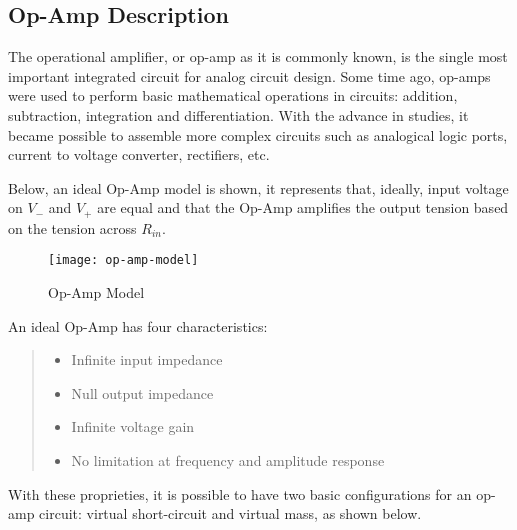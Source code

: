 \documentclass[journal]{IEEEtran}
\begin{document}
    \subsection{Op-Amp Description}
        The operational amplifier, or op-amp as it is commonly known, is the single most important integrated circuit for analog circuit design\cite[pp. 148]{irwin}. Some time ago, op-amps were used to perform basic mathematical operations in circuits: addition, subtraction, integration and differentiation. With the advance in studies, it became possible to assemble more complex circuits such as analogical logic ports, current to voltage converter, rectifiers, etc.
        \par Below, an ideal Op-Amp model is shown, it represents that, ideally, input voltage on $V_-$ and $V_+$ are equal and that the Op-Amp amplifies the output tension based on the tension across $R_{in}$.
        \begin{figure}[h]
            \begin{center}
                \texttt{[image: op-amp-model]}
                \caption{Op-Amp Model}
                \label{fig:op-amp-model}
            \end{center}
        \end{figure}
        \par An ideal Op-Amp has four characteristics\cite{amp_op_ideal}:
            \begin{quote}
                \begin{itemize}
                    \item Infinite input impedance
                    \item Null output impedance
                    \item Infinite voltage gain
                    \item No limitation at frequency and amplitude response
    
                    \label{list:proprieties}
                \end{itemize}
            \end{quote}
            
        With these proprieties, it is possible to have two basic configurations for an op-amp circuit: virtual short-circuit and virtual mass, as shown below.
        
\end{document}
